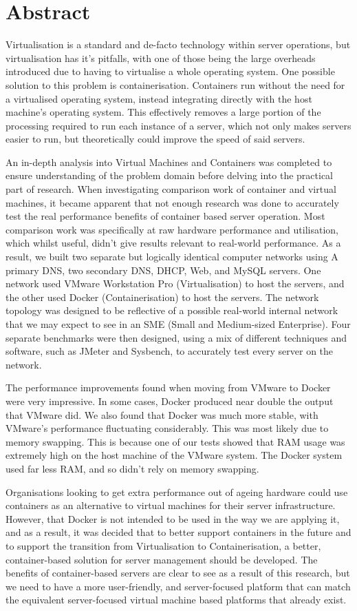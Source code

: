 
\chapter{Abstract}
Virtualisation is a standard and de-facto technology within server operations, but virtualisation has it's pitfalls, with one of those being the large overheads introduced due to having to virtualise a whole operating system. One possible solution to this problem is containerisation. Containers run without the need for a virtualised operating system, instead integrating directly with the host machine's operating system. This effectively removes a large portion of the processing required to run each instance of a server, which not only makes servers easier to run, but theoretically could improve the speed of said servers.

An in-depth analysis into Virtual Machines and Containers was completed to ensure understanding of the problem domain before delving into the practical part of research. When investigating comparison work of container and virtual machines, it became apparent that not enough research was done to accurately test the real performance benefits of container based server operation. Most comparison work was specifically at raw hardware performance and utilisation, which whilst useful, didn't give results relevant to real-world performance. As a result, we built two separate but logically identical computer networks using A primary DNS, two secondary DNS, DHCP, Web, and MySQL servers. One network used VMware Workstation Pro (Virtualisation) to host the servers, and the other used Docker (Containerisation) to host the servers. The network topology was designed to be reflective of a possible real-world internal network that we may expect to see in an SME (Small and Medium-sized Enterprise). Four separate benchmarks were then designed, using a mix of different techniques and software, such as JMeter and Sysbench, to accurately test every server on the network.

The performance improvements found when moving from VMware to Docker were very impressive. In some cases, Docker produced near double the output that VMware did. We also found that Docker was much more stable, with VMware's performance fluctuating considerably. This was most likely due to memory swapping. This is because one of our tests showed that RAM usage was extremely high on the host machine of the VMware system. The Docker system used far less RAM, and so didn't rely on memory swapping.

Organisations looking to get extra performance out of ageing hardware could use containers as an alternative to virtual machines for their server infrastructure. However, that Docker is not intended to be used in the way we are applying it, and as a result, it was decided that to better support containers in the future and to support the transition from Virtualisation to Containerisation, a better, container-based solution for server management should be developed. The benefits of container-based servers are clear to see as a result of this research, but we need to have a more user-friendly, and server-focused platform that can match the equivalent server-focused virtual machine based platforms that already exist.